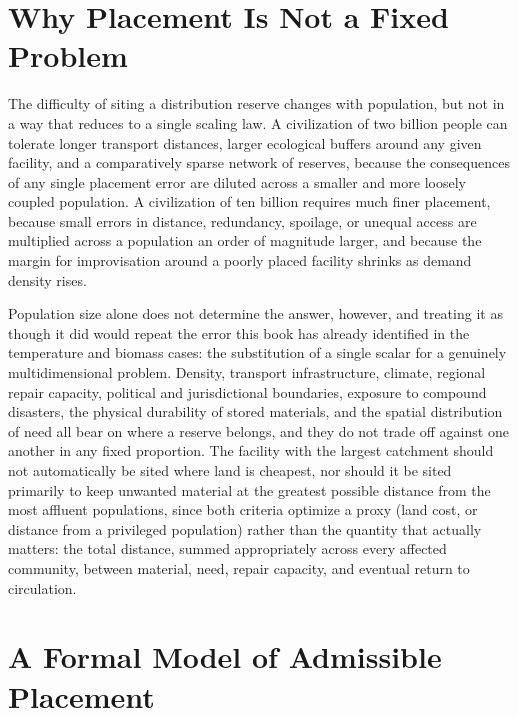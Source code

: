 \documentclass[11pt,oneside]{book}
\begin{document}
\section*{Why Placement Is Not a Fixed Problem}

The difficulty of siting a distribution reserve changes with population, but not in a way that reduces to a single scaling law. A civilization of two billion people can tolerate longer transport distances, larger ecological buffers around any given facility, and a comparatively sparse network of reserves, because the consequences of any single placement error are diluted across a smaller and more loosely coupled population. A civilization of ten billion requires much finer placement, because small errors in distance, redundancy, spoilage, or unequal access are multiplied across a population an order of magnitude larger, and because the margin for improvisation around a poorly placed facility shrinks as demand density rises.

Population size alone does not determine the answer, however, and treating it as though it did would repeat the error this book has already identified in the temperature and biomass cases: the substitution of a single scalar for a genuinely multidimensional problem. Density, transport infrastructure, climate, regional repair capacity, political and jurisdictional boundaries, exposure to compound disasters, the physical durability of stored materials, and the spatial distribution of need all bear on where a reserve belongs, and they do not trade off against one another in any fixed proportion. The facility with the largest catchment should not automatically be sited where land is cheapest, nor should it be sited primarily to keep unwanted material at the greatest possible distance from the most affluent populations, since both criteria optimize a proxy (land cost, or distance from a privileged population) rather than the quantity that actually matters: the total distance, summed appropriately across every affected community, between material, need, repair capacity, and eventual return to circulation.

\section*{A Formal Model of Admissible Placement}
\end{document}
